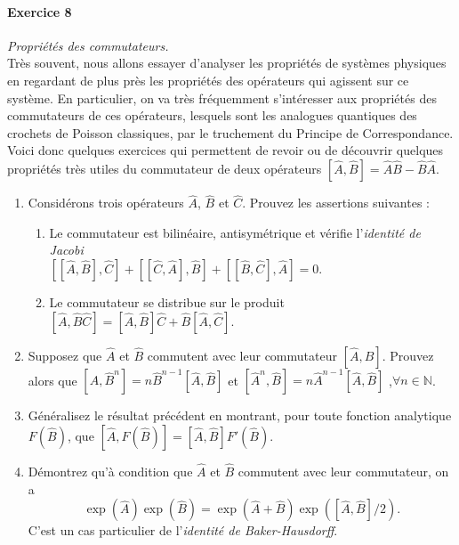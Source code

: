 \paragraph{Exercice 8} \textit{Propriétés des commutateurs.} \\
Très souvent, nous allons essayer d’analyser les propriétés de systèmes physiques en regardant de plus près les propriétés des opérateurs qui agissent sur ce système. En particulier, on va très fréquemment s'intéresser aux propriétés des commutateurs de ces opérateurs, lesquels sont les analogues quantiques des crochets de Poisson classiques, par le truchement du Principe de Correspondance. Voici donc quelques exercices qui permettent de revoir ou de découvrir quelques propriétés très utiles du commutateur de deux opérateurs $[\hat A,\hat B] = \hat A\hat B-\hat B\hat A$.
\begin{enumerate}
\item Considérons trois opérateurs $\hat A$, $\hat B$ et $\hat C$. Prouvez les assertions suivantes :
	\begin{enumerate}
	\item Le commutateur est bilinéaire, antisymétrique et vérifie l'\textit{identité de Jacobi}\\ $[[\hat A,\hat B],\hat C] + [[\hat C,\hat A],\hat B] + [[\hat B,\hat C],\hat A] = 0$.
	\item Le commutateur se distribue sur le produit $[\hat A,\hat B\hat C] = [\hat A,\hat B]\hat C + \hat B [\hat A, \hat C]$.
	\end{enumerate}
\item Supposez que $\hat A$ et $\hat B$ commutent avec leur commutateur $[\hat A,\hat B]$. Prouvez alors que $[\hat A,\hat B^n] = n \hat B^{n-1} [\hat A, \hat B]$ et $[ \hat A^n, \hat B] = n  \hat A^{n-1} [ \hat A, \hat B]$ ,$\forall n \in \mathbb{N}$.
\item Généralisez le résultat précédent en montrant, pour toute fonction analytique $F( \hat B)$, que $[ \hat A,F( \hat B)] = [ \hat A, \hat B] F'( \hat B)$. 
\item Démontrez qu'à condition que $\hat  A$ et $\hat  B$ commutent avec leur commutateur, on a
\begin{equation}
\exp(\hat  A) \exp(\hat  B) = \exp(\hat  A + \hat  B) \exp([\hat  A,\hat  B]/2).
\end{equation}
C'est un cas particulier de l'\textit{identité de Baker-Hausdorff}.
\end{enumerate}
	
